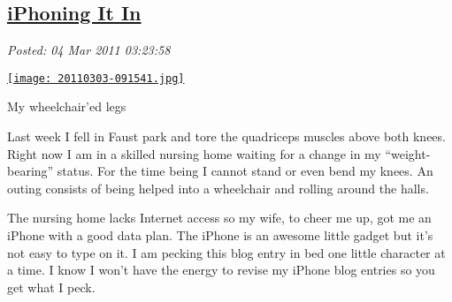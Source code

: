 %

\subsection*{\href{http://bakerjd99.wordpress.com/2011/03/03/iphoning-it-in/}{iPhoning It In}}


\noindent\emph{Posted: 04 Mar 2011 03:23:58}
\vspace{6pt}

\captionsetup[floatingfigure]{labelformat=empty}
\begin{floatingfigure}[r]{0.29\textwidth}
\centering
\href{http://bakerjd99.files.wordpress.com/2011/03/20110303-091541.jpg}{\texttt{[image: 20110303-091541.jpg]}}
\caption{My wheelchair'ed legs}
\label{fig:1184X0}
\end{floatingfigure}Last week I fell in Faust park and tore the quadriceps muscles above
both knees. Right now I am in a skilled nursing home waiting for a
change in my ``weight-bearing'' status. For the time being I cannot
stand or even bend my knees. An outing consists of being helped into a
wheelchair and rolling around the halls.

The nursing home lacks Internet access so my wife, to cheer me up, got
me an iPhone with a good data plan. The iPhone is an awesome little
gadget but it's not easy to type on it. I am pecking this blog entry in
bed one little character at a time. I know I won't have the energy to
revise my iPhone blog entries so you get what I peck.





%